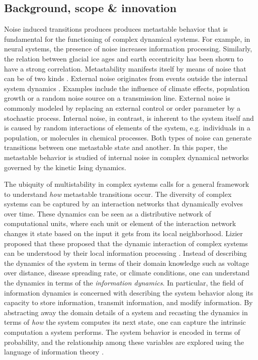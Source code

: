\documentclass[a4paper, 11pt, twocolumn]{article}
\begin{document}
\subsection{Background, scope \& innovation}
\label{sec:orgd888f8c}
Noise  induced  transitions   produces  produces  metastable
behavior that is fundamental  for the functioning of complex
dynamical  systems.  For  example, in  neural  systems,  the
presence   of   noise  increases   information   processing.
Similarly, the  relation between glacial ice  ages and earth
eccentricity has  been shown  to have a  strong correlation.
Metastability manifests itself by means of noise that can be
of two  kinds \cite{Forgoston2018}. External  noise originates
from   events   outside   the   internal   system   dynamics
\cite{Calim2021,Czaplicka2013a}.    Examples    include    the
influence of climate effects,  population growth or a random
noise  source  on a  transmission  line.  External noise  is
commonly modeled  by replacing an external  control or order
parameter  by  a  stochastic  process.  Internal  noise,  in
contrast, is inherent to the  system itself and is caused by
random  interactions   of  elements  of  the   system,  e.g.
individuals  in  a  population,  or  molecules  in  chemical
processes.  Both types  of  noise  can generate  transitions
between one metastable state and another. In this paper, the
metastable behavior is studied  of internal noise in complex
dynamical networks governed by the kinetic Ising dynamics.

The ubiquity of multistability  in complex systems calls for
a   general  framework   to   understand  \emph{how}   metastable
transitions occur.  The diversity of complex  systems can be
captured by an interaction networks that dynamically evolves
over  time. These  dynamics can  be seen  as a  distributive
network of  computational units, where each  unit or element
of the  interaction network  changes it  state based  on the
input it  gets from its local  neighborhood. Lizier proposed
that these proposed that  the dynamic interaction of complex
systems  can  be  understood   by  their  local  information
processing \cite{Lizier2008,Lizier2013,Lizier2018}. Instead of
describing  the dynamics  of the  system in  terms of  their
domain  knowledge such  as  voltage  over distance,  disease
spreading rate,  or climate  conditions, one  can understand
the  dynamics in  terms  of the  \emph{information dynamics}.  In
particular, the  field of information dynamics  is concerned
with describing  the system  behavior along its  capacity to
store   information,   transmit  information,   and   modify
information.  By abstracting  away the  domain details  of a
system  and recasting  the dynamics  in terms  of \emph{how}  the
system  computes  its  next   state,  one  can  capture  the
intrinsic computation a system performs. The system behavior
is  encoded in  terms of  probability, and  the relationship
among  these variables  are explored  using the  language of
information theory \cite{Quax2017}.
\end{document}
